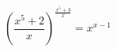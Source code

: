\documentclass{article}
\begin{document}
\[
\left(\frac{x^5+2}{x}\right)^{\frac{x^5+3}{x}} = x^{x-1}
\]
\end{document}
